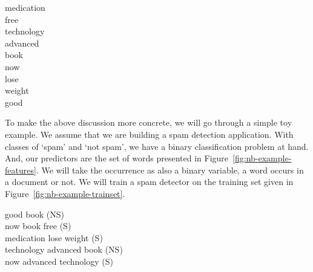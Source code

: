 \begin{marginfigure}[-8\baselineskip]
  \begin{tcolorbox}[fontupper=\tt]
    medication\\
    free\\
    technology\\
    advanced\\
    book\\
    now\\
    lose\\
    weight\\
    good\\
  \end{tcolorbox}
  \caption{\label{fig:nb-example-features}%
    The list of features for the naive Bayes example.
  }
\end{marginfigure}
To make the above discussion more concrete,
we will go through a simple toy example.
We assume that we are building a spam detection application.
With classes of `spam' and `not spam',
we have a binary classification problem at hand.
And, our predictors are the set of words
presented in Figure~\ref{fig:nb-example-features}.
We will take the occurrence as also a binary variable,
a word occurs in a document or not.
We will train a spam detector on the
training set given in Figure~\ref{fig:nb-example-trainset}.
\begin{marginfigure}
  \begin{tcolorbox}[fontupper=\scriptsize,colback=blue!20]
    good book (NS)\\
    now book free (S)\\
    medication lose weight (S)\\
    technology advanced book (NS)\\
    now advanced technology (S)
  \end{tcolorbox}
  \caption{\label{fig:nb-example-trainset}%
    Example training data for spam detection.
    Each line represents an email,
    followed by its label, spam (S) or not spam (NS)
    in parentheses.
  }
\end{marginfigure}

